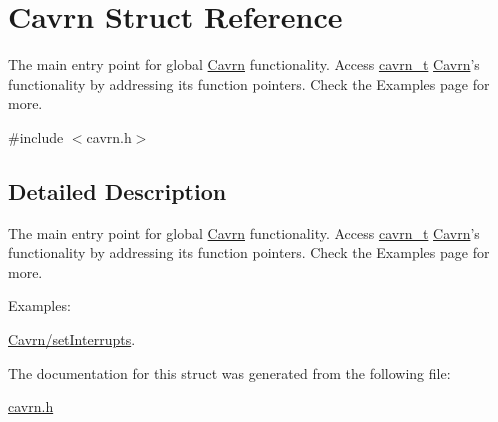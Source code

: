 \hypertarget{a00005}{\section{Cavrn Struct Reference}
\label{a00005}
}


The main entry point for global \hyperlink{a00005}{Cavrn} functionality. Access \hyperlink{a00006}{cavrn\-\_\-t} \hyperlink{a00005}{Cavrn}'s functionality by addressing its function pointers. Check the Examples page for more.  




{\ttfamily \#include $<$cavrn.\-h$>$}



\subsection{Detailed Description}
The main entry point for global \hyperlink{a00005}{Cavrn} functionality. Access \hyperlink{a00006}{cavrn\-\_\-t} \hyperlink{a00005}{Cavrn}'s functionality by addressing its function pointers. Check the Examples page for more. \begin{Desc}
\item[Examples\-: ]\par
\hyperlink{a00001}{Cavrn/set\-Interrupts}.\end{Desc}


The documentation for this struct was generated from the following file\-:\begin{DoxyCompactItemize}
\item 
\hyperlink{a00011}{cavrn.\-h}\end{DoxyCompactItemize}
